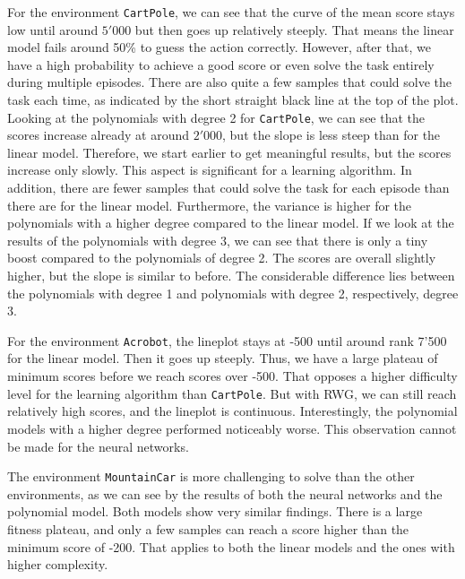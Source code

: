 For the environment \verb|CartPole|, we can see that the curve of the mean score stays low until around $5'000$ but then goes up relatively steeply. That means the linear model fails around 50\% to guess the action correctly. However, after that, we have a high probability to achieve a good score or even solve the task entirely during multiple episodes. There are also quite a few samples that could solve the task each time, as indicated by the short straight black line at the top of the plot. Looking at the polynomials with degree 2 for \verb|CartPole|, we can see that the scores increase already at around $2'000$, but the slope is less steep than for the linear model. Therefore, we start earlier to get meaningful results, but the scores increase only slowly. This aspect is significant for a learning algorithm. In addition, there are fewer samples that could solve the task for each episode than there are for the linear model. Furthermore, the variance is higher for the polynomials with a higher degree compared to the linear model. If we look at the results of the polynomials with degree 3, we can see that there is only a tiny boost compared to the polynomials of degree 2. The scores are overall slightly higher, but the slope is similar to before. The considerable difference lies between the polynomials with degree 1 and polynomials with degree 2, respectively, degree 3.

For the environment \verb|Acrobot|, the lineplot stays at -500 until around rank 7'500 for the linear model. Then it goes up steeply. Thus, we have a large plateau of minimum scores before we reach scores over -500. That opposes a higher difficulty level for the learning algorithm than \verb|CartPole|. But with RWG, we can still reach relatively high scores, and the lineplot is continuous. Interestingly, the polynomial models with a higher degree performed noticeably worse. This observation cannot be made for the neural networks.

The environment \verb|MountainCar| is more challenging to solve than the other environments, as we can see by the results of both the neural networks and the polynomial model. Both models show very similar findings. There is a large fitness plateau, and only a few samples can reach a score higher than the minimum score of -200. That applies to both the linear models and the ones with higher complexity.

